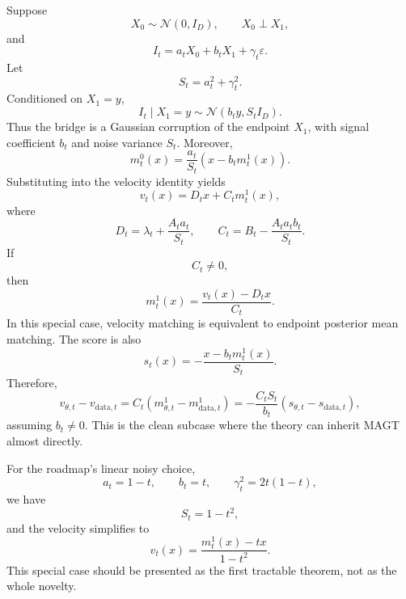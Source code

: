 \documentclass[11pt]{article}
\newcommand{\cN}{\mathcal{N}}
\newcommand{\data}{\mathrm{data}}
\theoremstyle{plain}
\theoremstyle{definition}
\begin{document}
Suppose
\begin{equation}
X_0\sim\cN(0,I_D),
\qquad
X_0\perp X_1,
\end{equation}
and
\begin{equation}
I_t=a_tX_0+b_tX_1+\gamma_t\varepsilon.
\end{equation}
Let
\begin{equation}
S_t=a_t^2+\gamma_t^2.
\end{equation}
Conditioned on \(X_1=y\),
\begin{equation}
I_t\mid X_1=y
\sim
\cN(b_ty,S_tI_D).
\end{equation}
Thus the bridge is a Gaussian corruption of the endpoint \(X_1\), with signal
coefficient \(b_t\) and noise variance \(S_t\). Moreover,
\begin{equation}
m_t^0(x)
=
\frac{a_t}{S_t}
\left(
x-b_tm_t^1(x)
\right).
\end{equation}
Substituting into the velocity identity yields
\begin{equation}
v_t(x)
=
D_t x+C_t m_t^1(x),
\end{equation}
where
\begin{equation}
D_t
=
\lambda_t+\frac{A_ta_t}{S_t},
\qquad
C_t
=
B_t-\frac{A_ta_tb_t}{S_t}.
\end{equation}
If
\begin{equation}
C_t\ne0,
\end{equation}
then
\begin{equation}
m_t^1(x)
=
\frac{v_t(x)-D_tx}{C_t}.
\end{equation}
In this special case, velocity matching is equivalent to endpoint posterior mean
matching. The score is also
\begin{equation}
s_t(x)
=
-\frac{x-b_tm_t^1(x)}{S_t}.
\end{equation}
Therefore,
\begin{equation}
v_{\theta,t}-v_{\data,t}
=
C_t
\left(
m_{\theta,t}^1-m_{\data,t}^1
\right)
=
-\frac{C_tS_t}{b_t}
\left(
s_{\theta,t}-s_{\data,t}
\right),
\end{equation}
assuming \(b_t\ne0\). This is the clean subcase where the theory can inherit
MAGT almost directly.

For the roadmap's linear noisy choice,
\begin{equation}
a_t=1-t,
\qquad
b_t=t,
\qquad
\gamma_t^2=2t(1-t),
\end{equation}
we have
\begin{equation}
S_t=1-t^2,
\end{equation}
and the velocity simplifies to
\begin{equation}
v_t(x)
=
\frac{m_t^1(x)-tx}{1-t^2}.
\end{equation}
This special case should be presented as the first tractable theorem, not as the
whole novelty.
\end{document}
